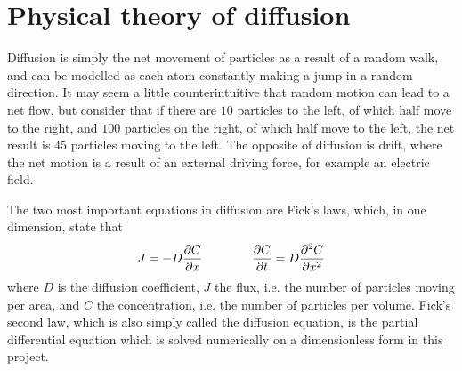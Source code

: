 \section{Physical theory of diffusion}
Diffusion is simply the net movement of particles as a result of a random walk, and can be modelled as each atom constantly making a jump in a random  direction. It may seem a little counterintuitive that random motion can lead to a net flow, but consider that if there are \(10\) particles to the left, of which half move to the right, and \(100\) particles on the right, of which half move to the left, the net result is \(45\) particles moving to the left. The opposite of diffusion is drift, where the net motion is a result of an external driving force, for example an electric field.

The two most important equations in diffusion are Fick's laws, which, in one dimension, state that
\[
J = -D\pdv{C}{x} \qquad \qquad \pdv{C}{t} = D\pdv[2]{C}{x}
\]
where \(D\) is the diffusion coefficient, \(J\) the flux, i.e. the number of particles moving per area, and \(C\) the concentration, i.e. the number of particles per volume. Fick's second law, which is also simply called the diffusion equation, is the partial differential equation which is solved numerically on a dimensionless form in this project.



